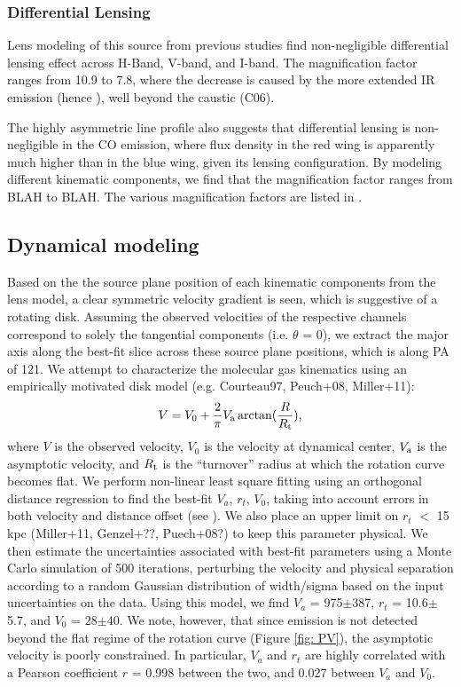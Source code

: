 \documentclass[]{emulateapj}
\begin{document}
\subsubsection{Differential Lensing} \label{sec:differential}
Lens modeling of this source from previous studies find non-negligible differential lensing effect across H-Band, V-band, and I-band. The magnification factor ranges from 10.9
to 7.8, where the decrease is caused
by the more extended IR emission (hence \SF), well beyond the caustic (C06).

The highly asymmetric \bco line profile also suggests that differential lensing is non-negligible in the CO emission, where
flux density in the red wing is apparently much higher than in the blue wing, given its lensing configuration.
By modeling different kinematic components, we find that the magnification factor ranges from BLAH to BLAH. The various magnification factors are listed in .




\subsection{\bco Dynamical modeling} \label{sec:dynamics}
Based on the the source plane position of each kinematic components from the
lens model, a clear symmetric velocity gradient is seen, which is suggestive of a rotating disk. Assuming the observed velocities of the respective channels
correspond to solely the tangential components (i.e. $\theta$ = 0), we extract
the major axis along the best-fit slice across these source plane positions,
which is along PA of 121\degr.
We attempt to characterize the molecular gas kinematics using an empirically motivated disk model (e.g. Courteau97, Peuch+08, Miller+11):
\begin{equation}
V = V_0 + \frac{2}{\pi} V_{\rm a} \arctan(\frac{R}{R_{\rm t}}),
\end{equation}
where $V$ is the observed velocity, $V_0$ is the velocity at dynamical center, $V_{\rm a}$ is the asymptotic velocity, and $R_{\rm t}$ is the ``turnover'' radius at which the rotation curve
becomes flat. We perform non-linear least square fitting using an orthogonal distance regression to find the best-fit $V_a$, $r_t$, $V_0$, taking into account
errors in both velocity and distance offset (see ). We also place an upper limit on $r_t$ $<$ 15 kpc (Miller+11, Genzel+??, Puech+08?) to keep this
parameter physical. We then estimate the uncertainties associated with best-fit parameters using a Monte Carlo simulation of 500 iterations, perturbing
the velocity and physical separation according to a random Gaussian distribution of width/sigma based on the input uncertainties on
the data. Using this model, we find $V_a$ = 975$\pm$387, $r_t$ = 10.6$\pm$5.7,
and $V_0$ = 28$\pm$40. We note, however, that since emission is not detected beyond the flat regime of the rotation curve (Figure \ref{fig: PV}), the asymptotic velocity is
poorly constrained. In particular, $V_a$ and $r_t$ are highly correlated with a Pearson coefficient $r$ = 0.998 between the two, and 0.027 between $V_a$ and $V_0$.
\end{document}
